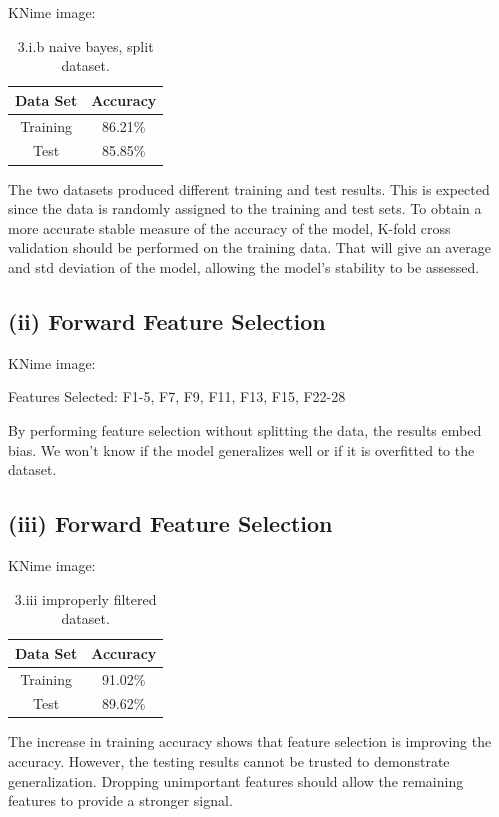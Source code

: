 \documentclass[11pt]{article}
\begin{document}
KNime image: 

\begin{table}[H]
	\centering
	\begin{tabular}{ | c | c | }
		\hline
		\textbf{Data Set} & \textbf{Accuracy} \\
		\hline
		Training & 86.21\% \\
		\hline
		Test & 85.85\% \\
		\hline
	\end{tabular}
	\caption{3.i.b naive bayes, split dataset.}
\end{table}

The two datasets produced different training and test results. This is expected since the data is randomly assigned to the training and test sets. To obtain a more accurate stable measure of the accuracy of the model, K-fold cross validation should be performed on the training data. That will give an average and std deviation of the model, allowing the model's stability to be assessed.

\subsection{(ii) Forward Feature Selection}

KNime image: 

Features Selected: F1-5, F7, F9, F11, F13, F15, F22-28

By performing feature selection without splitting the data, the results embed bias. We won't know if the model generalizes well or if it is overfitted to the dataset.

\subsection{(iii) Forward Feature Selection}

KNime image: 

\begin{table}[H]
	\centering
	\begin{tabular}{ | c | c | }
		\hline
		\textbf{Data Set} & \textbf{Accuracy} \\
		\hline
		Training & 91.02\% \\
		\hline
		Test & 89.62\% \\
		\hline
	\end{tabular}
	\caption{3.iii improperly filtered dataset.}
\end{table}

The increase in training accuracy shows that feature selection is improving the accuracy. However, the testing results cannot be trusted to demonstrate generalization. Dropping unimportant features should allow the remaining features to provide a stronger signal.
\end{document}
